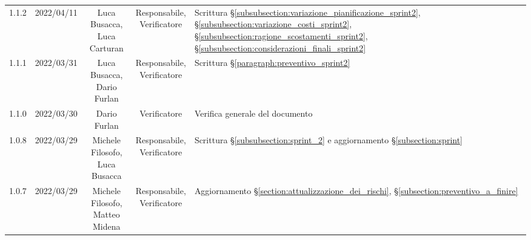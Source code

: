 \begin{center}
\begin{longtable}[c]{c | c | c | c | p{5cm}}
		1.1.2                                                      & 2022/04/11 & \Shortunderstack{Luca Busacca,                                                                                                                                                                      \\Luca Carturan} & \Shortunderstack{Responsabile,\\Verificatore} & Scrittura §\ref{subsubsection:variazione_pianificazione_sprint2}, §\ref{subsubsection:variazione_costi_sprint2}, §\ref{subsubsection:ragione_scostamenti_sprint2}, §\ref{subsubsection:considerazioni_finali_sprint2}\\
		1.1.1                                                      & 2022/03/31 & \Shortunderstack{Luca Busacca,                                                                                                                                                                      \\Dario Furlan} & \Shortunderstack{Responsabile,\\Verificatore} & Scrittura §\ref{paragraph:preventivo_sprint2}\\
		1.1.0                                                      & 2022/03/30 & Dario Furlan                           & Verificatore   & Verifica generale del documento                                                                                                           \\
		1.0.8                                                      & 2022/03/29 & \Shortunderstack{Michele Filosofo,                                                                                                                                                                  \\Luca Busacca} & \Shortunderstack{Responsabile,\\Verificatore} & Scrittura §\ref{subsubsection:sprint_2} e aggiornamento §\ref{subsection:sprint}\\
		1.0.7                                                      & 2022/03/29 & \Shortunderstack{Michele Filosofo,                                                                                                                                                                  \\Matteo Midena} & \Shortunderstack{Responsabile,\\Verificatore} & Aggiornamento §\ref{section:attualizzazione_dei_rischi}, §\ref{subsection:preventivo_a_finire}\\

\end{longtable}
\end{center}
